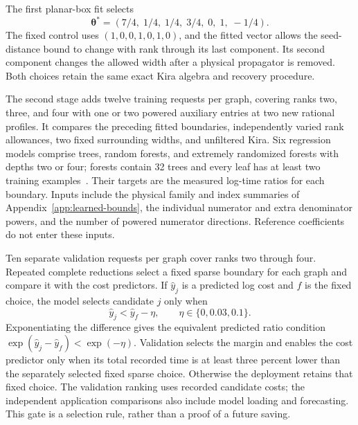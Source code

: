 The first planar-box fit selects
\begin{equation}
 \boldsymbol\theta^*=(7/4,\;1/4,\;1/4,\;3/4,\;0,\;1,\;-1/4).
 \label{eq:geometry-first-fit}
\end{equation}
The fixed control uses $(1,0,0,1,0,1,0)$, and the fitted vector allows the seed-distance bound to change with rank through its last component. Its second component changes the allowed width after a physical propagator is removed. Both choices retain the same exact Kira algebra and recovery procedure.

The second stage adds twelve training requests per graph, covering ranks two, three, and four with one or two powered auxiliary entries at two new rational profiles. It compares the preceding fitted boundaries, independently varied rank allowances, two fixed surrounding widths, and unfiltered Kira. Six regression models comprise trees, random forests, and extremely randomized forests with depths two or four; forests contain 32 trees and every leaf has at least two training examples~\cite{CART1984,Breiman2001Forest,Geurts2006ExtraTrees}. Their targets are the measured log-time ratios for each boundary. Inputs include the physical family and index summaries of Appendix~\ref{app:learned-bounds}, the individual numerator and extra denominator powers, and the number of powered numerator directions. Reference coefficients do not enter these inputs.

Ten separate validation requests per graph cover ranks two through four. Repeated complete reductions select a fixed sparse boundary for each graph and compare it with the cost predictors. If $\widehat y_j$ is a predicted log cost and $f$ is the fixed choice, the model selects candidate $j$ only when
\begin{equation}
 \widehat y_j<\widehat y_f-\eta,
 \qquad\eta\in\{0,0.03,0.1\}.
 \label{eq:geometry-gate}
\end{equation}
Exponentiating the difference gives the equivalent predicted ratio condition $\exp(\widehat y_j-\widehat y_f)<\exp(-\eta)$. Validation selects the margin and enables the cost predictor only when its total recorded time is at least three percent lower than the separately selected fixed sparse choice. Otherwise the deployment retains that fixed choice. The validation ranking uses recorded candidate costs; the independent application comparisons also include model loading and forecasting. This gate is a selection rule, rather than a proof of a future saving.

